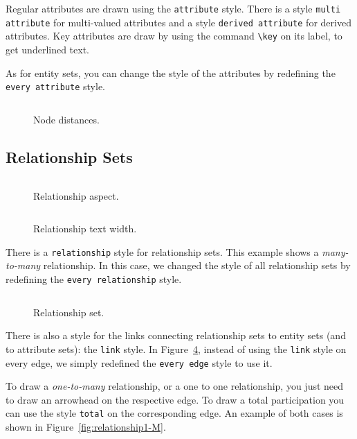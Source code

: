 \documentclass[12pt]{article}
\newcommand{\demo}[1]{
  \bigskip
  \begin{minipage}{\linewidth}
      \begin{center}
          
      \end{center}
      \begin{center}
          \scriptsize
          \inputminted{latex}{snippets/#1.tex}
      \end{center}
  \end{minipage}
}
\begin{document}
Regular attributes are drawn using the \texttt{attribute} style. There is a
style \texttt{multi attribute} for multi-valued attributes and a style
\texttt{derived attribute} for derived attributes. Key attributes are draw by
using the command \verb+\key+ on its label, to get underlined text.

As for entity sets, you can change the style of the attributes by redefining the
\texttt{every attribute} style.

\begin{figure}[htb!]
    \centering
    \demo{node-distances}
    \caption{Node distances.}
\label{fig:node-distances}
\end{figure}

%

\subsection{Relationship Sets}
\label{sec:relationships}

\begin{figure}[htb!]
    \centering
    \demo{relationship-aspect}
    \caption{Relationship aspect.}
\label{fig:relationship-aspect}
\end{figure}

\begin{figure}[htb!]
    \centering
    \demo{relationship-text-width}
    \caption{Relationship text width.}
\label{fig:relationship-text-width}
\end{figure}

There is a \texttt{relationship} style for relationship sets. This example
shows a \emph{many-to-many} relationship. In this case, we changed the style of
all relationship sets by redefining the \texttt{every relationship} style.

\begin{figure}[htb!]
    \centering
    \demo{relationshipM-M}
    \caption{Relationship set.}
\label{fig:relationship}
\end{figure}

There is also a style for the links connecting relationship sets to entity sets
(and to attribute sets): the \texttt{link} style. In
Figure~\ref{fig:relationship}, instead of using the \texttt{link} style on
every edge, we simply redefined the \texttt{every edge} style to use it.

To draw a \emph{one-to-many} relationship, or a one to one relationship, you
just need to draw an arrowhead on the respective edge. To draw a total
participation you can use the style \texttt{total} on the corresponding edge. An
example of both cases is shown in Figure~\ref{fig:relationship1-M}.
\end{document}
